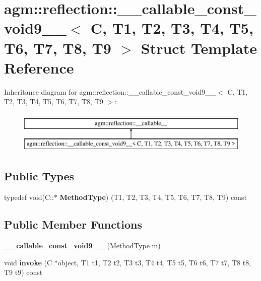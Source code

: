 \hypertarget{structagm_1_1reflection_1_1____callable__const__void9____}{}\section{agm\+:\+:reflection\+:\+:\+\_\+\+\_\+callable\+\_\+const\+\_\+void9\+\_\+\+\_\+$<$ C, T1, T2, T3, T4, T5, T6, T7, T8, T9 $>$ Struct Template Reference}
\label{structagm_1_1reflection_1_1____callable__const__void9____}
Inheritance diagram for agm\+:\+:reflection\+:\+:\+\_\+\+\_\+callable\+\_\+const\+\_\+void9\+\_\+\+\_\+$<$ C, T1, T2, T3, T4, T5, T6, T7, T8, T9 $>$\+:\begin{figure}[H]
\begin{center}
\leavevmode
\includegraphics[height=2.000000cm]{structagm_1_1reflection_1_1____callable__const__void9____}
\end{center}
\end{figure}
\subsection*{Public Types}
\begin{DoxyCompactItemize}
\item 
typedef void(C\+::$\ast$ {\bfseries Method\+Type}) (T1, T2, T3, T4, T5, T6, T7, T8, T9) const \hypertarget{structagm_1_1reflection_1_1____callable__const__void9_____a4ee18973f1dc66ad14b33b6c1058a0ec}{}\label{structagm_1_1reflection_1_1____callable__const__void9_____a4ee18973f1dc66ad14b33b6c1058a0ec}

\end{DoxyCompactItemize}
\subsection*{Public Member Functions}
\begin{DoxyCompactItemize}
\item 
{\bfseries \+\_\+\+\_\+callable\+\_\+const\+\_\+void9\+\_\+\+\_\+} (Method\+Type m)\hypertarget{structagm_1_1reflection_1_1____callable__const__void9_____ac91a6b8ac0b2001ecdeb0e3431e8ba85}{}\label{structagm_1_1reflection_1_1____callable__const__void9_____ac91a6b8ac0b2001ecdeb0e3431e8ba85}

\item 
void {\bfseries invoke} (C $\ast$object, T1 t1, T2 t2, T3 t3, T4 t4, T5 t5, T6 t6, T7 t7, T8 t8, T9 t9) const \hypertarget{structagm_1_1reflection_1_1____callable__const__void9_____a895fedf7d6d0e0223dfeb356db13c683}{}\label{structagm_1_1reflection_1_1____callable__const__void9_____a895fedf7d6d0e0223dfeb356db13c683}

\end{DoxyCompactItemize}

